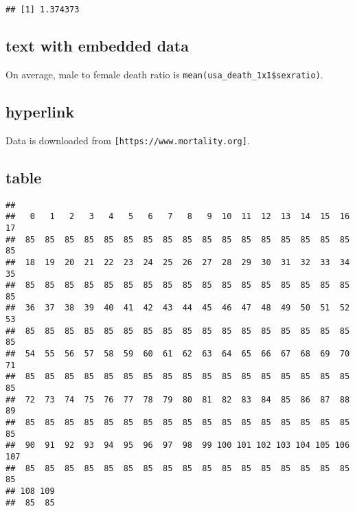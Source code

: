 \documentclass[]{article}
\newenvironment{Shaded}{\begin{snugshade}}{\end{snugshade}}
\newcommand{\KeywordTok}[1]{\textcolor[rgb]{0.13,0.29,0.53}{\textbf{#1}}}
\newcommand{\NormalTok}[1]{#1}
\newcommand{\OperatorTok}[1]{\textcolor[rgb]{0.81,0.36,0.00}{\textbf{#1}}}
\begin{document}
\begin{Shaded}
\end{Shaded}

\begin{verbatim}
## [1] 1.374373
\end{verbatim}

\hypertarget{text-with-embedded-data}{%
\subsection{text with embedded data}\label{text-with-embedded-data}}

On average, male to female death ratio is
\texttt{mean(usa\_death\_1x1\$sexratio)}.

\hypertarget{hyperlink}{%
\subsection{hyperlink}\label{hyperlink}}

Data is downloaded from \texttt{{[}https://www.mortality.org{]}}.

\hypertarget{table}{%
\subsection{table}\label{table}}

\begin{Shaded}
\end{Shaded}

\begin{verbatim}
## 
##   0   1   2   3   4   5   6   7   8   9  10  11  12  13  14  15  16  17 
##  85  85  85  85  85  85  85  85  85  85  85  85  85  85  85  85  85  85 
##  18  19  20  21  22  23  24  25  26  27  28  29  30  31  32  33  34  35 
##  85  85  85  85  85  85  85  85  85  85  85  85  85  85  85  85  85  85 
##  36  37  38  39  40  41  42  43  44  45  46  47  48  49  50  51  52  53 
##  85  85  85  85  85  85  85  85  85  85  85  85  85  85  85  85  85  85 
##  54  55  56  57  58  59  60  61  62  63  64  65  66  67  68  69  70  71 
##  85  85  85  85  85  85  85  85  85  85  85  85  85  85  85  85  85  85 
##  72  73  74  75  76  77  78  79  80  81  82  83  84  85  86  87  88  89 
##  85  85  85  85  85  85  85  85  85  85  85  85  85  85  85  85  85  85 
##  90  91  92  93  94  95  96  97  98  99 100 101 102 103 104 105 106 107 
##  85  85  85  85  85  85  85  85  85  85  85  85  85  85  85  85  85  85 
## 108 109 
##  85  85
\end{verbatim}
\end{document}
